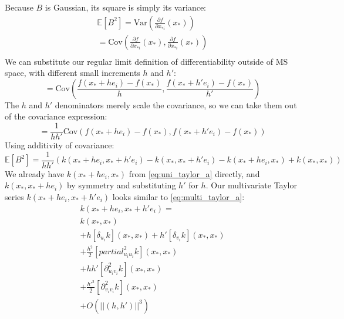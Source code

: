 Because $B$ is Gaussian, its square is simply its variance:
\begin{equation*}
    \begin{aligned}
        \mathbb{E}[B^2] = \text{Var}\left(\frac{\partial f}{\partial x_{*i}}(x_*)\right) \\
        = \text{Cov} \left(\frac{\partial f}{\partial x_{*i}}(x_*), \frac{\partial f}{\partial x_{*i}}(x_*) \right) \\
    \end{aligned}
\end{equation*}
We can substitute our regular limit definition of differentiability outside of MS space, with different small increments $h$ and $h'$:
\begin{equation*}
    = \text{Cov} \left(\frac{f(x_* + h e_i) - f(x_*)}{h}, \frac{f(x_* + h' e_i) - f(x_*)}{h'} \right)
\end{equation*}
The $h$ and $h'$ denominators merely scale the covariance, so we can take them out of the covariance expression:
\begin{equation*}
    = \frac{1}{hh'} \text{Cov} \left(f(x_* + h e_i) - f(x_*), f(x_* + h' e_i) - f(x_*) \right)
\end{equation*}
Using additivity of covariance:
\begin{equation*}
    \mathbb{E}[B^2] = \frac{1}{hh'} \left( k(x_* + h e_i, x_* + h' e_i) - k(x_*, x_* + h' e_i) - k(x_* + h e_i, x_*) + k(x_*, x_*) \right)
\end{equation*}
We already have $k(x_* + h e_i, x_*)$ from \ref{eq:uni_taylor_a} directly, and $k(x_*, x_* + h e_i)$ by symmetry and substituting $h'$ for $h$. Our multivariate Taylor series $k(x_* + h e_i, x_* + h' e_i)$ looks similar to \ref{eq:multi_taylor_a}:
\begin{equation*}
    \begin{aligned}
        k(x_* + h e_i, x_* + h' e_i) = \\
        k(x_*, x_*) \\
        + h [\delta_{u_i}k](x_*, x_*) 
        + h' [\delta_{v_i}k](x_*, x_*) \\
        + \frac{h^2}{2} [partial_{u_i u_i}^2k](x_*, x_*) \\
        + hh' [\partial_{u_i v_i}^2k](x_*, x_*) \\
        + \frac{h'^2}{2} [\partial_{v_i v_i}^2k](x_*, x_*) \\
        + O(||(h,h')||^3)
    \end{aligned}
\end{equation*}

